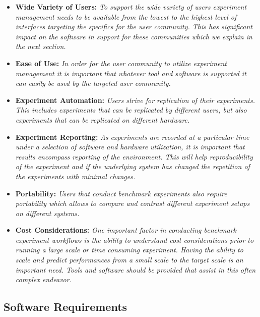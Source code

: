 \documentclass[utf8]{FrontiersinVancouver} %
\begin{document}
\begin{BOX}

\begin{itemize}

\item {\bf Wide Variety of Users:} {\it To support the wide variety of users experiment management needs to be available from the lowest to the highest level of interfaces targeting the specifics for the user community. This has significant impact on the software in support for these communities which we explain in the next section.}
\item {\bf Ease of Use:} {\it In order for the user community to utilize experiment management it is important that whatever tool and software is supported it can easily be used by the targeted user community.}
\item {\bf Experiment Automation:} {\it Users strive for replication of their experiments. This includes experiments that can be replicated by different users, but also experiments that can be replicated on different hardware.}
\item {\bf Experiment Reporting:} {\it As experiments are recorded at a particular time under a selection of software and hardware utilization, it is important that results encompass reporting of the environment. This will help reproducibility of the experiment and if the underlying system has changed the repetition of the experiments with minimal changes.}
\item {\bf Portability:} {\it Users that conduct benchmark experiments also require portability which allows to compare and contrast different experiment setups on different systems.}
\item {\bf Cost Considerations:} {\it One important factor in conducting benchmark experiment workflows is the ability to understand cost considerations prior to running a large scale or time consuming experiment. Having the ability to scale and predict performances from a small scale to the target scale is an important need. Tools and software should be provided that assist in this often complex endeavor.}

\end{itemize}
    
\end{BOX}

\subsection{Software Requirements}
\label{sec:sw-requirements}
\end{document}
